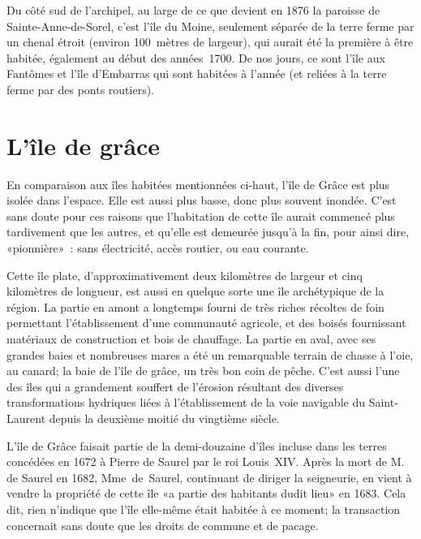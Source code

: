 \documentclass[12pt]{report}
\begin{document}
Du côté sud de l’archipel, au large de ce que devient en 1876 la paroisse de Sainte-Anne-de-Sorel, c’est l’île du Moine, seulement séparée de la terre ferme par un chenal étroit (environ 100 mètres de largeur), qui aurait été la première à être habitée, également au début des années 1700. De nos jours, ce sont l’île aux Fantômes et l’île d’Embarras qui sont habitées à l’année (et reliées à la terre ferme par des ponts routiers).

\section{L’île de grâce}

En comparaison aux îles habitées mentionnées ci-haut, l’île de Grâce est plus isolée dans l’espace. Elle est aussi plus basse, donc plus souvent inondée. C’est sans doute pour ces raisons que l’habitation de cette île aurait commencé plus tardivement que les autres, et qu’elle est demeurée jusqu’à la fin, pour ainsi dire, «pionnière» : sans électricité, accès routier, ou eau courante.

Cette île plate, d’approximativement deux kilomètres de largeur et cinq kilomètres de longueur, est aussi en quelque sorte une île archétypique de la région. La partie en amont a longtemps fourni de très riches récoltes de foin permettant l’établissement d’une communauté agricole, et des boisés fournissant matériaux de construction et bois de chauffage. La partie en aval, avec ses grandes baies et nombreuses mares a été un remarquable terrain de chasse à l’oie, au canard; la baie de l’île de grâce, un très bon coin de pêche. C’est aussi l’une des îles qui a grandement souffert de l’érosion résultant des diverses transformations hydriques liées à l’établissement de la voie navigable du Saint-Laurent depuis la deuxième moitié du vingtième siècle.


L’île de Grâce faisait partie de la demi-douzaine d’îles incluse dans les terres concédées en 1672 à Pierre de Saurel par le roi Louis XIV. Après la mort de M. de Saurel en 1682, Mme de Saurel, continuant de diriger la seigneurie, en vient à vendre la propriété de cette île «a partie des habitants dudit lieu» en 1683. Cela dit, rien n’indique que l’île elle-même était habitée à ce moment; la transaction concernait sans doute que les droits de commune et de pacage. 
\end{document}
